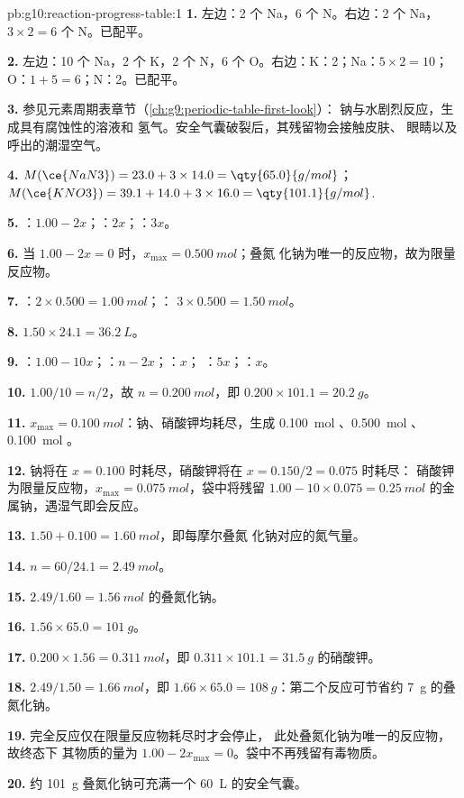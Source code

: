 \begin{solution}{pb:g10:reaction-progress-table:1}
\textbf{1.} 左边：2 个 Na，6 个 N。右边：2 个 Na，$3 \times 2 = 6$ 个 N。已配平。

\textbf{2.} 左边：10 个 Na，2 个 K，2 个 N，6 个 O。右边：K：2；Na：$5 \times 2 =
10$；O：$1 + 5 = 6$；N：2。已配平。

\textbf{3.} 参见元素周期表章节（\cref{ch:g9:periodic-table-first-look}）：
钠与水剧烈反应，生成具有腐蚀性的溶液和
氢气。安全气囊破裂后，其残留物会接触皮肤、
眼睛以及呼出的潮湿空气。

\textbf{4.} $M(\ce{NaN3}) = 23.0 + 3 \times 14.0 = \qty{65.0}{g/mol}$；
$M(\ce{KNO3}) = 39.1 + 14.0 + 3 \times 16.0 = \qty{101.1}{g/mol}$.

\textbf{5.} ：$1.00 - 2x$；：$2x$；：$3x$。

\textbf{6.} 当 $1.00 - 2x = 0$ 时，$x_{\max} = \qty{0.500}{mol}$；叠氮
化钠为唯一的反应物，故为限量反应物。

\textbf{7.} ：$2 \times 0.500 = \qty{1.00}{mol}$；：
$3 \times 0.500 = \qty{1.50}{mol}$。

\textbf{8.} $1.50 \times 24.1 = \qty{36.2}{L}$。

\textbf{9.} ：$1.00 - 10x$；：$n - 2x$；：$x$；
：$5x$；：$x$。

\textbf{10.} $1.00/10 = n/2$，故 $n = \qty{0.200}{mol}$，即
$0.200 \times 101.1 = \qty{20.2}{g}$。

\textbf{11.} $x_{\max} = \qty{0.100}{mol}$：钠、硝酸钾均耗尽，生成
\qty{0.100}{mol} 、\qty{0.500}{mol} 、
\qty{0.100}{mol} 。

\textbf{12.} 钠将在 $x = 0.100$ 时耗尽，硝酸钾将在 $x = 0.150/2 = 0.075$ 时耗尽：
硝酸钾为限量反应物，$x_{\max} =
\qty{0.075}{mol}$，袋中将残留 $1.00 - 10 \times 0.075 = \qty{0.25}{mol}$
的金属钠，遇湿气即会反应。

\textbf{13.} $1.50 + 0.100 = \qty{1.60}{mol}$，即每摩尔叠氮
化钠对应的氮气量。

\textbf{14.} $n = 60 / 24.1 = \qty{2.49}{mol}$。

\textbf{15.} $2.49 / 1.60 = \qty{1.56}{mol}$ 的叠氮化钠。

\textbf{16.} $1.56 \times 65.0 = \qty{101}{g}$。

\textbf{17.} $0.200 \times 1.56 = \qty{0.311}{mol}$，即
$0.311 \times 101.1 = \qty{31.5}{g}$ 的硝酸钾。

\textbf{18.} $2.49 / 1.50 = \qty{1.66}{mol}$，即
$1.66 \times 65.0 = \qty{108}{g}$：第二个反应可节省约
\qty{7}{g} 的叠氮化钠。

\textbf{19.} 完全反应仅在限量反应物耗尽时才会停止，
此处叠氮化钠为唯一的反应物，故终态下
其物质的量为 $1.00 - 2x_{\max} = 0$。袋中不再残留有毒物质。

\textbf{20.} 约 \qty{101}{g} 叠氮化钠可充满一个 \qty{60}{L}
的安全气囊。
\end{solution}
